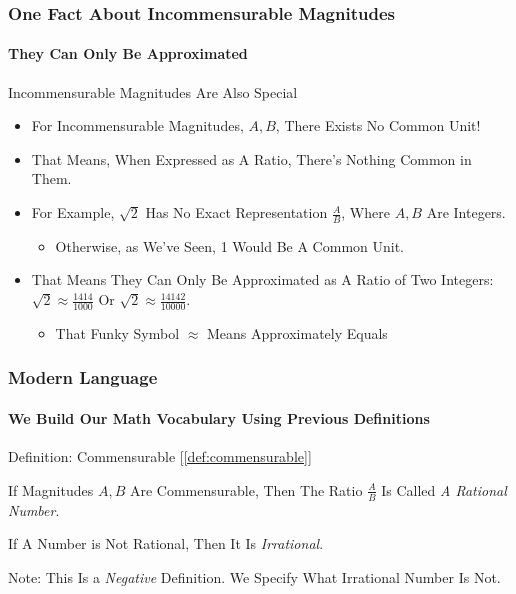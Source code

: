 \documentclass{beamer}
\begin{document}
\begin{frame}
\frametitle{One Fact About Incommensurable Magnitudes}
\framesubtitle{They Can Only Be Approximated}
\label{slide:incommensurablefact}
\begin{block}{Incommensurable Magnitudes Are Also Special}
\begin{itemize}
\pause
\item For Incommensurable Magnitudes, $A,B$, \alert{There Exists No Common Unit}!
\pause
\item That Means, When Expressed as A Ratio, There's Nothing Common in Them.
\pause
\item For Example, $\sqrt{2}$ Has \alert{No Exact Representation $\frac{A}{B}$}, Where $A, B$ Are Integers.
\begin{itemize}
\pause
\item Otherwise, as We've Seen, 1 Would Be A Common Unit.
\end{itemize}
\pause
\item That Means They Can Only Be \alert{Approximated as A Ratio of Two Integers: $\sqrt{2}\approx\frac{1414}{1000}$ Or $\sqrt{2}\approx\frac{14142}{10000}$}.
\begin{itemize}
\pause\item{\tiny That Funky Symbol $\approx$ Means \alert{Approximately Equals}}
\end{itemize}
\end{itemize}
\end{block}
\end{frame}

\begin{frame}
\frametitle{Modern Language}
\framesubtitle{We Build Our Math Vocabulary Using Previous Definitions}
\label{slide:modernlanguage}

Definition: Commensurable [\ref{def:commensurable}]
\pause
\begin{definition}
If Magnitudes $A,B$ Are Commensurable,
Then
The Ratio $\frac{A}{B}$ Is Called 
\textit{A Rational Number}.
\end{definition}
\pause
\begin{definition}
If A Number is Not Rational, Then It Is \textit{Irrational}.
\pause

{\tiny Note: This Is a \textit{Negative} Definition. We Specify What Irrational Number Is Not.}
\end{definition}
\end{frame}
\end{document}
